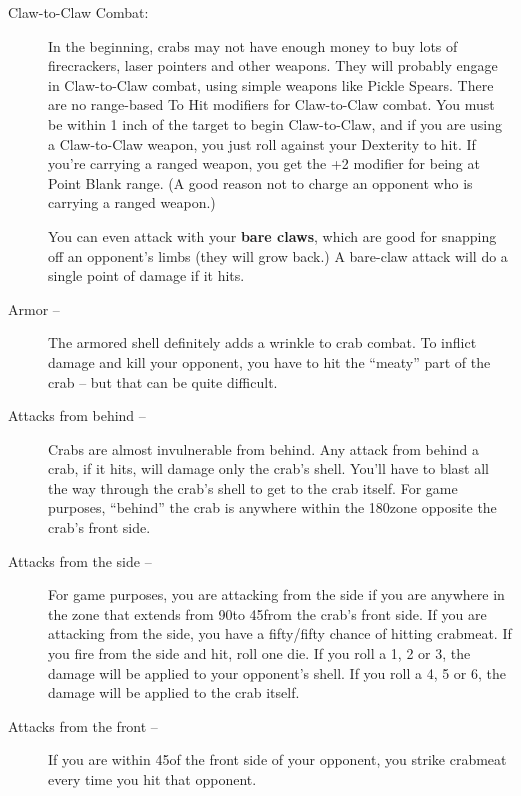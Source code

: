 \documentclass[a4paper,10pt]{article}
\begin{document}
\begin{description}
 \item[Claw-to-Claw Combat:] In the beginning, crabs may not have enough money to buy lots of firecrackers, laser pointers and other weapons. They will probably engage in Claw-to-Claw combat, using simple weapons like Pickle Spears. There are no range-based To Hit modifiers for Claw-to-Claw combat. You must be within 1 inch of the target to begin Claw-to-Claw, and if you are using a Claw-to-Claw weapon, you just roll against your Dexterity to hit. If you're carrying a ranged weapon, you get the +2 modifier for being at Point Blank range. (A good reason not to charge an opponent who is carrying a ranged weapon.)

You can even attack with your \textbf{bare claws}, which are good for snapping off an opponent's limbs (they will grow back.) A bare-claw attack will do a single point of damage if it hits.

 \item[Armor --] The armored shell definitely adds a wrinkle to crab combat. To inflict damage and kill your opponent, you have to hit the ``meaty'' part of the crab -- but that can be quite difficult.

 \item[Attacks from behind --] Crabs are almost invulnerable from behind. Any attack from behind a crab, if it hits, will damage only the crab's shell. You'll have to blast all the way through the crab's shell to get to the crab itself. For game purposes, ``behind'' the crab is anywhere within the 180\textdegree\hspace{4pt}zone opposite the crab's front side.

 \item[Attacks from the side --] For game purposes, you are attacking from the side if you are anywhere in the zone that extends from 90\textdegree\hspace{4pt}to 45\textdegree\hspace{4pt}from the crab's front side. If you are attacking from the side, you have a fifty/fifty chance of hitting crabmeat. If you fire from the side and hit, roll one die. If you roll a 1, 2 or 3, the damage will be applied to your opponent's shell. If you roll a 4, 5 or 6, the damage will be applied to the crab itself.

 \item[Attacks from the front --] If you are within 45\textdegree\hspace{4pt}of the front side of your opponent, you strike crabmeat every time you hit that opponent.


\end{description}
\end{document}
